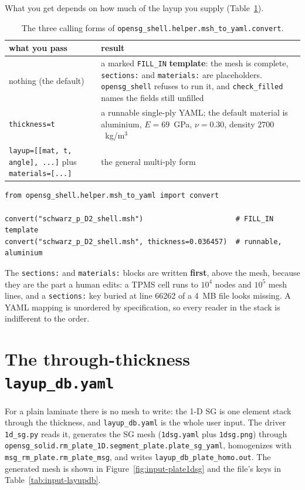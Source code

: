 What you get depends on how much of the layup you supply
(Table~\ref{tab:input-mshconv}).

\begin{table}[htbp]
\centering
\small
\caption{The three calling forms of
\texttt{opensg\_shell.helper.msh\_to\_yaml.convert}.}
\label{tab:input-mshconv}
\begin{tabular}{@{}p{4.4cm}p{7.4cm}@{}}
\toprule
what you pass & result \\
\midrule
nothing (the default) & a marked \texttt{FILL\_IN} \textbf{template}:
  the mesh is complete, \texttt{sections:} and \texttt{materials:} are
  placeholders. \texttt{opensg\_shell} refuses to run it, and
  \texttt{check\_filled} names the fields still unfilled \\
\texttt{thickness=t} & a runnable single-ply YAML; the
  default material is aluminium, $E = 69$~GPa, $\nu = 0.30$, density
  $2700$~kg/m$^3$ \\
\texttt{layup=[[mat, t, angle], ...]} \newline plus \texttt{materials=[...]} &
  the general multi-ply form \\
\bottomrule
\end{tabular}
\end{table}

\begin{lstlisting}[style=opensg,caption={Converting a gmsh surface mesh to an msg-shell SG YAML.}]
from opensg_shell.helper.msh_to_yaml import convert

convert("schwarz_p_D2_shell.msh")                      # FILL_IN template
convert("schwarz_p_D2_shell.msh", thickness=0.036457)  # runnable, aluminium
\end{lstlisting}

\noindent
The \texttt{sections:} and \texttt{materials:} blocks are written
\textbf{first}, above the mesh, because they are the part a human edits: a TPMS
cell runs to $10^4$ nodes and $10^5$ mesh lines, and a \texttt{sections:} key
buried at line 66262 of a 4~MB file looks missing. A YAML mapping is unordered
by specification, so every reader in the stack is indifferent to the order.

\section{The through-thickness \texttt{layup\_db.yaml}}
\label{sec:input-layupdb}

For a plain laminate there is no mesh to write: the 1-D SG is one element stack
through the thickness, and \texttt{layup\_db.yaml} is the whole user input. The
driver \texttt{1d\_sg.py} reads it, generates the SG mesh (\texttt{1dsg.yaml}
plus \texttt{1dsg.png}) through
\texttt{opensg\_solid.rm\_plate\_1D.segment\_plate.plate\_sg\_yaml}, homogenizes
with \texttt{msg\_rm\_plate.rm\_plate\_msg}, and writes
\texttt{layup\_db\_plate\_homo.out}. The generated mesh is shown in
Figure~\ref{fig:input-plate1dsg} and the file's keys in
Table~\ref{tab:input-layupdb}.

